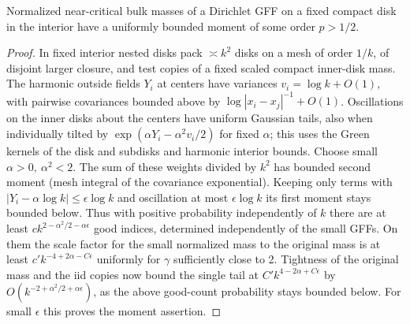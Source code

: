 \begin{lemma}\label{proxy:bulk-moment}
Normalized near-critical bulk masses of a Dirichlet GFF on a fixed compact disk in the interior have a uniformly bounded moment of some order \(p>1/2\). \end{lemma}\begin{proof}
 In fixed interior nested disks pack \(\asymp k^2\) disks on a mesh of order \(1/k\), of disjoint larger closure, and test copies of a fixed scaled compact inner-disk mass.
The harmonic outside fields \(Y_i\) at centers have variances \(v_i=\log k+O(1)\), with pairwise covariances bounded above by \(\log |x_i-x_j|^{-1}+O(1)\).
Oscillations on the inner disks about the centers have uniform Gaussian tails, also when individually tilted by \(\exp(\alpha Y_i-\alpha^2 v_i/2)\) for fixed \(\alpha\); this uses the Green kernels of the disk and subdisks and harmonic interior bounds.
Choose small \(\alpha>0,\ \alpha^2<2\).
The sum of these weights divided by \(k^2\) has bounded second moment (mesh integral of the covariance exponential).
Keeping only terms with \(|Y_i-\alpha\log k|\le\epsilon\log k\) and oscillation at most \(\epsilon\log k\) its first moment stays bounded below.
Thus with positive probability independently of \(k\) there are at least \(c k^{2-\alpha^2/2-\alpha\epsilon}\) good indices, determined independently of the small GFFs.
On them the scale factor for the small normalized mass to the original mass is at least \(c' k^{-4+2\alpha-C\epsilon}\) uniformly for \(\gamma\) sufficiently close to 2.
Tightness of the original mass and the iid copies now bound the single tail at \(C' k^{4-2\alpha+C\epsilon}\) by \(O(k^{-2+\alpha^2/2+\alpha\epsilon})\), as the above good-count probability stays bounded below.
For small \(\epsilon\) this proves the moment assertion.
\end{proof}

